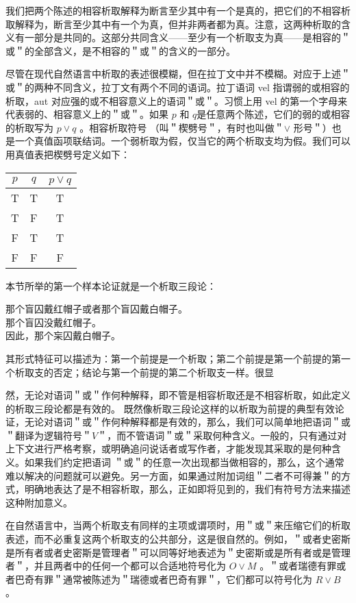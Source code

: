 我们把两个陈述的相容析取解释为断言至少其中有一个是真的，把它们的不相容析取解释为，断言至少其中有一个为真，但并非两者都为真。注意，这两种析取的含义有一部分是共同的。这部分共同含义——至少有一个析取支为真——是相容的＂或＂的全部含义，是不相容的＂或＂的含义的一部分。

尽管在现代自然语言中析取的表述很模糊，但在拉丁文中并不模糊。对应于上述＂或＂的两种不同含义，拉丁文有两个不同的语词。拉丁语词 vel 指谓弱的或相容的析取，aut 对应强的或不相容意义上的语词＂或＂。习惯上用 vel 的第一个字母来代表弱的、相容意义上的＂或＂。如果 $p$ 和 $q$是任意两个陈述，它们的弱的或相容的析取写为 $p \vee q$ 。相容析取符号 （叫＂楔劈号＂，有时也叫做＂$\vee$ 形号＂）也是一个真值函项联结词。一个弱析取为假，仅当它的两个析取支均为假。我们可以用真值表把楔劈号定义如下：

\begin{center}
\begin{tabular}{|ccc|}
\hline
$p$ & $q$ & $p \vee q$ \\
\hline
T & T & T \\
T & F & T \\
F & T & T \\
F & F & F \\
\hline
\end{tabular}
\end{center}

本节所举的第一个样本论证就是一个析取三段论\cite{boole1854}：

那个盲囚戴红帽子或者那个盲囚戴白帽子。\\
那个盲囚没戴红帽子。\\
因此，那个杗囚戴白帽子。

其形式特征可以描述为：第一个前提是一个析取；第二个前提是第一个前提的第一个析取支的否定；结论与第一个前提的第二个析取支一样。很显

然，无论对语词＂或＂作何种解释，即不管是相容析取还是不相容析取，如此定义的析取三段论都是有效的。\cite{russell1903} 既然像析取三段论这样的以析取为前提的典型有效论证，无论对语词＂或＂作何种解释都是有效的，那么，我们可以简单地把语词＂或＂翻译为逻辑符号＂$V$＂，而不管语词＂或＂采取何种含义。一般的，只有通过对上下文进行严格考察，或明确追问说话者或写作者，才能发现其采取的是何种含义。如果我们约定把语词 ＂或＂的任意一次出现都当做相容的，那么，这个通常难以解决的问题就可以避免。另一方面，如果通过附加词组＂二者不可得兼＂的方式，明确地表达了是不相容析取，那么，正如即将见到的，我们有符号方法来描述这种附加意义。

在自然语言中，当两个析取支有同样的主项或谓项时，用＂或＂来压缩它们的析取表述，而不必重复这两个析取支的公共部分，这是很自然的。例如，＂或者史密斯是所有者或者史密斯是管理者＂可以同等好地表述为＂史密斯或是所有者或是管理者＂，并且两者中的任何一个都可以合适地符号化为 $O \vee M$ 。＂或者瑞德有罪或者巴奇有罪＂通常被陈述为＂瑞德或者巴奇有罪＂，它们都可以符号化为 $R \vee B$ 。

